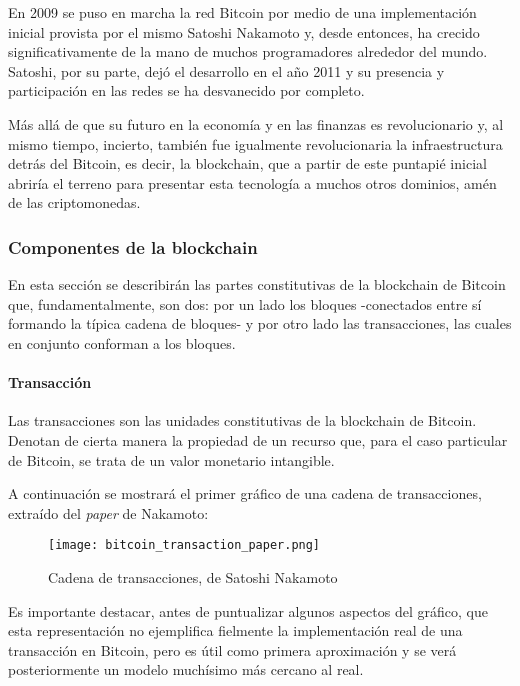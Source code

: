 En 2009 se puso en marcha la red Bitcoin por medio de una implementación inicial provista por el mismo Satoshi Nakamoto y, desde entonces, ha crecido significativamente de la mano de muchos programadores alrededor del mundo. Satoshi, por su parte, dejó el desarrollo en el año 2011 y su presencia y participación en las redes se ha desvanecido por completo.

Más allá de que su futuro en la economía y en las finanzas es revolucionario y, al mismo tiempo, incierto, también fue igualmente revolucionaria la infraestructura detrás del Bitcoin, es decir, la blockchain, que a partir de este puntapié inicial abriría el terreno para presentar esta tecnología a muchos otros dominios, amén de las criptomonedas.

\subsubsection{Componentes de la blockchain}
\label{bc_bitcoin_components}

En esta sección se describirán las partes constitutivas de la blockchain de Bitcoin que, fundamentalmente, son dos: por un lado los bloques -conectados entre sí formando la típica cadena de bloques- y por otro lado las transacciones, las cuales en conjunto conforman a los bloques.

\paragraph{Transacción}
\label{bc_bitcoin_transaction}

Las transacciones son las unidades constitutivas de la blockchain de Bitcoin. Denotan de cierta manera la propiedad de un recurso que, para el caso particular de Bitcoin, se trata de un valor monetario intangible.

A continuación se mostrará el primer gráfico de una cadena de transacciones, extraído del \textit{paper} de Nakamoto:

\begin{figure}[H]
  \texttt{[image: bitcoin\_transaction\_paper.png]}
  \centering
  \caption{Cadena de transacciones, de Satoshi Nakamoto}
  \label{fig:bitcoin-transaction-paper}
\end{figure}

Es importante destacar, antes de puntualizar algunos aspectos del gráfico, que esta representación no ejemplifica fielmente la implementación real de una transacción en Bitcoin, pero es útil como primera aproximación y se verá posteriormente un modelo muchísimo más cercano al real.

